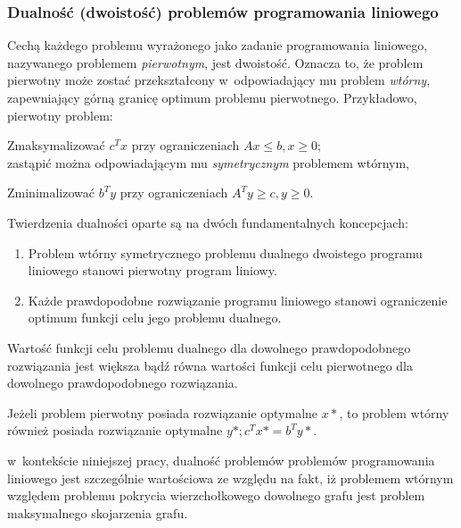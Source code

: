 \subsubsection{\textbf{Dualność (dwoistość) problemów programowania liniowego}}
\label{sss_lp_duality}
\par{
  Cechą każdego problemu wyrażonego jako zadanie programowania liniowego,
  nazywanego problemem \emph{pierwotnym}, jest dwoistość.
  Oznacza to, że problem pierwotny może zostać przekształcony w~odpowiadający mu
  problem \emph{wtórny}, zapewniający górną granicę optimum problemu
  pierwotnego. 
  Przykładowo, pierwotny problem:\par
  Zmaksymalizować $c^{T}x$ przy ograniczeniach $Ax\leq b, x \geq 0$;\\
  zastąpić można odpowiadającym mu \emph{symetrycznym} problemem wtórnym,\par
  Zminimalizować $b^{T}y$ przy ograniczeniach $A^{T}y \geq c, y \geq 0$.\\
}
\par{
  Twierdzenia dualności oparte są na dwóch fundamentalnych koncepcjach:
  \begin{enumerate}
    \item Problem wtórny symetrycznego problemu dualnego dwoistego programu
      liniowego stanowi pierwotny program liniowy.
    \item Każde prawdopodobne rozwiązanie programu liniowego stanowi
      ograniczenie optimum funkcji celu jego problemu dualnego.
  \end{enumerate}

  \begin{theorem}
    Wartość funkcji celu problemu dualnego dla dowolnego prawdopodobnego
    rozwiązania jest większa bądź równa wartości funkcji celu pierwotnego dla
    dowolnego prawdopodobnego rozwiązania.
  \end{theorem}
  \begin{theorem}
    Jeżeli problem pierwotny posiada rozwiązanie optymalne $x*$, to problem 
    wtórny również posiada rozwiązanie optymalne $y*; c^{T}x*=b^{T}y*$.
  \end{theorem}
}

\par{
  w~kontekście niniejszej pracy, dualność problemów problemów programowania
  liniowego jest szczególnie wartościowa ze względu na fakt, iż problemem
  wtórnym względem problemu pokrycia wierzchołkowego dowolnego grafu jest 
  problem maksymalnego skojarzenia grafu.
}

